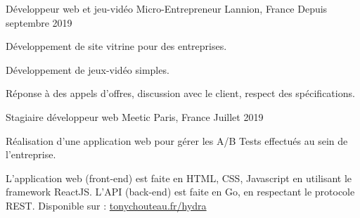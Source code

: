 

\begin{cventries}

  \cventry
    {Développeur web et jeu-vidéo} %
    {Micro-Entrepreneur} %
    {Lannion, France} %
    {Depuis septembre 2019} %
    {
      \begin{cvitems} %
        \item {Développement de site vitrine pour des entreprises.}
        \item {Développement de jeux-vidéo simples.}
        \item {Réponse à des appels d'offres, discussion avec le client, respect des spécifications.}
      \end{cvitems}
    }

  \cventry
    {Stagiaire développeur web} %
    {Meetic} %
    {Paris, France} %
    {Juillet 2019} %
    {
      \begin{cvitems} %
        \item {Réalisation d'une application web pour gérer les A/B Tests effectués au sein de l'entreprise.}
        \item {L'application web (front-end) est faite en HTML, CSS, Javascript en utilisant le framework ReactJS. L'API (back-end) est faite en Go, en respectant le protocole REST. Disponible sur : \href{https://www.tonychouteau.fr/hydra}{tonychouteau.fr/hydra}}
      \end{cvitems}
    }

\end{cventries}
